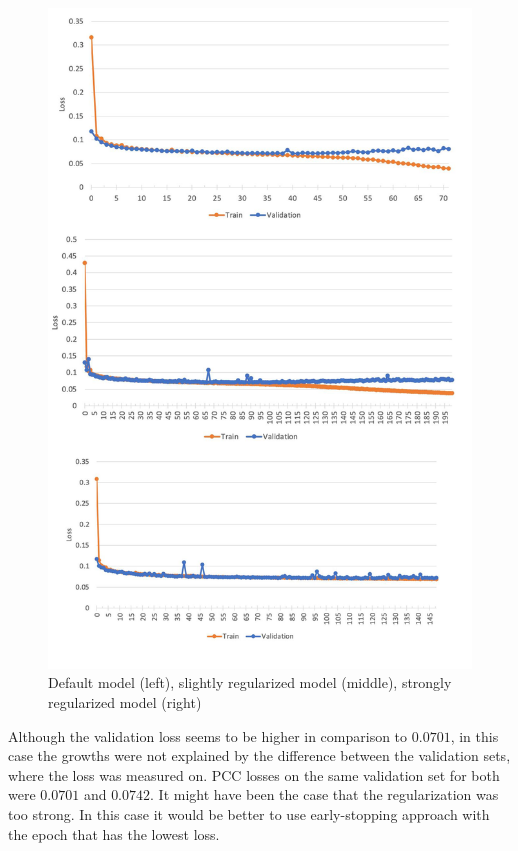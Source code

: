 \begin{figure}[H]
	\begin{center}
		\includegraphics[width=\linewidth]{bilder/ER/segmentation/reg-not-reg.png}
		\caption{Default model (left), slightly regularized model (middle), strongly regularized model (right)}\label{fig:er-overfit}
	\end{center}
\end{figure}

Although the validation loss seems to be higher in comparison to $0.0701$, in this case the growths were not explained by the difference between the validation sets, where the loss was measured on. PCC losses on the same validation set for both were $0.0701$ and $0.0742$. It might have been the case that the regularization was too strong. In this case it would be better to use early-stopping approach with the epoch that has the lowest loss.